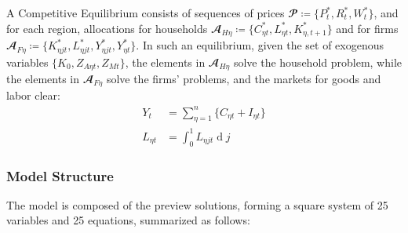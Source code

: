 \documentclass[
	12pt,
	]{article}
\numberwithin{equation}{section}
\DeclareMathOperator{\dif}{d}
\theoremstyle{definition}
\theoremstyle{plain}
\theoremstyle{plain}
\theoremstyle{plain}
\begin{document}
\sloppy A Competitive Equilibrium consists of sequences of prices $\mathbfscr{P} \coloneq \{P_t^\ast, R_t^\ast, W_t^\ast\}$, and for each region, allocations for households $\mathbfscr{A}_{H\eta} \coloneq \{C_{\eta t}^\ast, L_{\eta t}^\ast, K_{\eta, t+1}^\ast\}$ and for firms $\mathbfscr{A}_{F\eta} \coloneq \{K_{\eta jt}^\ast, L_{\eta jt}^\ast, Y_{\eta jt}^\ast, Y_{\eta t}^\ast\}$. In such an equilibrium, given the set of exogenous variables $\{K_0, Z_{A\eta t}, Z_{Mt}\}$, the elements in $\mathbfscr{A}_{H\eta}$ solve the household problem, while the elements in $\mathbfscr{A}_{F\eta}$ solve the firms' problems, and the markets for goods and labor clear:
\begin{align}
	Y_t &= \sum_{\eta = 1}^{n} \{ C_{\eta t} + I_{\eta t} \} \label{eq:market-clearing-condition} \\
	L_{\eta t} &= \int_{0}^{1} L_{\eta jt} \dif j \label{eq:market-clearing-condition-2}
\end{align}



\subsubsection{Model Structure}

The model is composed of the preview solutions, forming a square system of 25 variables and 25 equations, summarized as follows:
\end{document}
